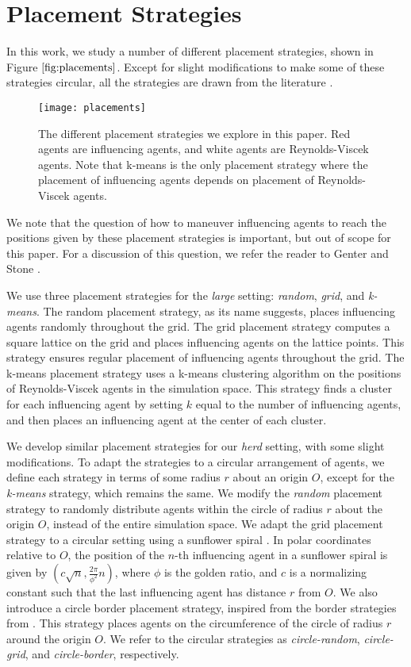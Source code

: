 \section{Placement Strategies}
In this work, we study a number of different placement strategies, shown in
Figure $\ref{fig:placements}$.
Except for slight modifications to make some of these strategies circular, all
the strategies are drawn from the literature \cite{genter2015placement,
genterthesis}.
\begin{figure}
    \centering
    \texttt{[image: placements]}
    \caption{The different placement strategies we explore in this paper.
    Red agents are influencing agents, and white agents are Reynolds-Viscek
    agents.
    Note that k-means is the only placement strategy where the placement of
    influencing agents depends on placement of Reynolds-Viscek agents.}
    \label{fig:placements}
\end{figure}
We note that the question of how to maneuver influencing agents to reach the
positions given by these placement strategies is important, but out of scope
for this paper.
For a discussion of this question, we refer the reader to Genter and Stone
\cite{genter2016facegoalfacecurrent, genterthesis}.

We use three placement strategies for the \textit{large} setting:
\textit{random}, \textit{grid}, and \textit{k-means}.
The random placement strategy, as its name suggests, places influencing agents
randomly throughout the grid.
The grid placement strategy computes a square lattice on the grid and places
influencing agents on the lattice points.
This strategy ensures regular placement of influencing agents throughout the
grid.
The k-means placement strategy uses a k-means clustering algorithm on the
positions of Reynolds-Viscek agents in the simulation space.
This strategy finds a cluster for each influencing agent by setting $k$ equal
to the number of influencing agents, and then places an influencing agent at
the center of each cluster.

We develop similar placement strategies for our \textit{herd} setting, with
some slight modifications.
To adapt the strategies to a circular arrangement of agents, we define each
strategy in terms of some radius $r$ about an origin $O$, except for the
\textit{k-means} strategy, which remains the same.
We modify the \textit{random} placement strategy to randomly distribute agents
within the circle of radius $r$ about the origin $O$, instead of the entire
simulation space.
We adapt the grid placement strategy to a circular setting using a sunflower
spiral \cite{segermansunflower}.
In polar coordinates relative to $O$, the position of the $n$-th influencing
agent in a sunflower spiral is given by $(c\sqrt{n}, \frac{2\pi}{\phi^2}n)$,
where $\phi$ is the golden ratio, and $c$ is a normalizing constant such that
the last influencing agent has distance $r$ from $O$.
We also introduce a circle border placement strategy, inspired from the border
strategies from \cite{genter2015placement}.
This strategy places agents on the circumference of the circle of radius $r$
around the origin $O$.
We refer to the circular strategies as \textit{circle-random},
\textit{circle-grid}, and \textit{circle-border}, respectively.

